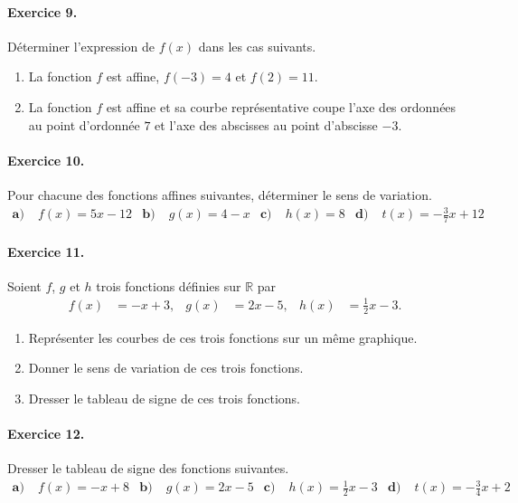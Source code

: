 \documentclass[11pt]{article}
\begin{document}
\paragraph{Exercice 9.} Déterminer l'expression de $f(x)$ dans les cas suivants.
\begin{enumerate}
  \item La fonction $f$ est affine, $f(-3)=4$ et $f(2)=11$.
  \item La fonction $f$ est affine et sa courbe représentative coupe l'axe des
    ordonnées au point d'ordonnée $7$ et l'axe des abscisses au point d'abscisse
    $-3$.
\end{enumerate}

\paragraph{Exercice 10.} Pour chacune des fonctions affines suivantes,
déterminer le sens de variation.
\begin{align*}
  \textbf{a)}\;& f(x)=5x-12 &
  \textbf{b)}\;& g(x)=4-x &
  \textbf{c)}\;& h(x)=8 &
  \textbf{d)}\;& t(x)=-\frac{3}{7}x+12
\end{align*}

\paragraph{Exercice 11.} Soient $f$, $g$ et $h$ trois fonctions définies sur
$\mathbb{R}$ par
\begin{align*}
  f(x) &= -x+3, &
  g(x) &=2x-5, &
  h(x) &= \frac{1}{2}x-3.
\end{align*}
\begin{enumerate}
  \item Représenter les courbes de ces trois fonctions sur un même graphique.
  \item Donner le sens de variation de ces trois fonctions.
  \item Dresser le tableau de signe de ces trois fonctions.
\end{enumerate}

\paragraph{Exercice 12.} Dresser le tableau de signe des fonctions suivantes.
\begin{align*}
  \textbf{a)}\;& f(x)=-x+8 &
  \textbf{b)}\;& g(x)=2x-5 &
  \textbf{c)}\;& h(x)=\frac{1}{2}x-3 &
  \textbf{d)}\;& t(x)=-\frac{3}{4}x+2
\end{align*}
\end{document}
